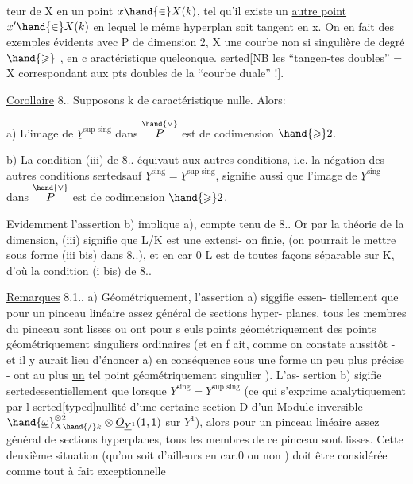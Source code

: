 
teur de X en un point $x\hand{\in} X(k)$,  tel qu'il existe un \uline{autre point}
$x'\hand{\in} X(k)$ en lequel le même hyperplan soit tangent en x. On en fait des
exemples évidents avec  P de dimension 2, X une courbe non si
singulière de degré $\hand{\geqslant}$  , en c aractéristique quelconque. \hand{\in}serted{[NB les ``tangen-tes doubles'' = X correspondant aux pts doubles de la ``courbe duale'' !].}

\uline{Corollaire} 8.. Supposons k de caractéristique nulle. Alors:

a) L'image de $\underline{Y}^{\text{sup sing}}$ dans $\overset{\hand{\vee}}{P}$ est de codimension $\hand{\geqslant} 2$.

b) La condition (iii) de 8.. équivaut aux autres conditions, i.e.
la négation des autres conditions\hand{,} \hand{\in}serted{sauf $\underline{Y}^{\text{sing}}=\underline{Y}^{\text{sup sing}}$,} signifie aussi que l'image de $\underline{Y}^{\text{sing}}$
dans $\overset{\hand{\vee}}{P}$ est de codimension $\hand{\geqslant} 2$.

Evidemment l'assertion b) implique a), compte tenu de 8.. Or
par la théorie de la dimension, (iii) signifie que L/K est une extensi-%
on finie,  (on pourrait le mettre sous forme (iii bis) dans 8..),
et en car 0  L est de toutes façons séparable sur K, d'où
la condition (i bis) de 8..

\uline{Remarques} 8.1.. a) Géométriquement, l'assertion a) siggifie essen-%
tiellement que pour un pinceau linéaire assez général de sections hyper-%
planes, tous les membres du pinceau sont lisses ou ont 
 pour s euls points géométriquement des points géométriquement
singuliers ordinaires (et en f ait, comme on constate aussitôt - et il
y aurait lieu d'énoncer a) en conséquence sous une forme un peu plus
précise - ont au plus \uline{un} tel point géométriquement singulier ). L'as-%
sertion b) sigifie \hand{\in}serted{essentiellement} que lorsque $\underline{Y}^{\text{sing}}=\underline{Y}^{\text{sup sing}}$ (ce qui s'exprime
analytiquement par l \hand{\in}serted[typed]{nullité} d'une certaine section D d'un Module
inversible $\hand{\underline{\omega}}^{\otimes 2}_{X\hand{/}k}\otimes\underline{O}_{\underline{Y}^1}(1,1)$ sur $\underline{Y}^1$), alors pour un pinceau linéaire
assez général de sections hyperplanes, tous les membres de ce 
pinceau sont lisses. Cette deuxième situation (qu'on soit d'ailleurs
en car.0 ou non ) doit être considérée comme tout à fait exceptionnelle


